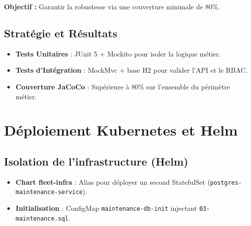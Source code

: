 \documentclass[12pt,a4paper]{article}
\begin{document}
\begin{infobox}
\textbf{Objectif :} Garantir la robustesse via une couverture minimale de 80\%.
\end{infobox}

\subsection{Stratégie et Résultats}
\begin{itemize}
    \item \textbf{Tests Unitaires} : JUnit 5 + Mockito pour isoler la logique métier.
    \item \textbf{Tests d'Intégration} : MockMvc + base H2 pour valider l'API et le RBAC.
    \item \textbf{Couverture JaCoCo} : Supérieure à 80\% sur l'ensemble du périmètre métier.
\end{itemize}

\section{Déploiement Kubernetes et Helm}

\subsection{Isolation de l'infrastructure (Helm)}
\begin{itemize}
    \item \textbf{Chart fleet-infra} : Alias pour déployer un second StatefulSet (\texttt{postgres-maintenance-service}).
    \item \textbf{Initialisation} : ConfigMap \texttt{maintenance-db-init} injectant \texttt{03-maintenance.sql}.
\end{itemize}
\end{document}
